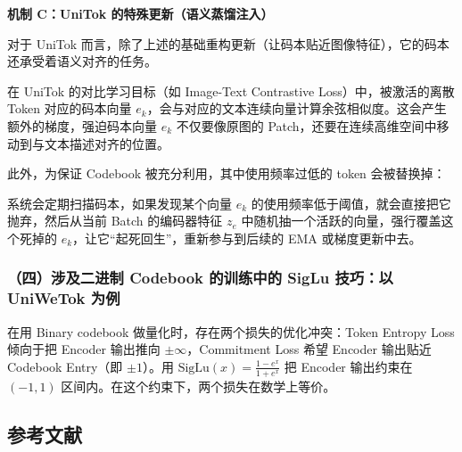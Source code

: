 \textbf{机制 C：UniTok 的特殊更新（语义蒸馏注入）}

对于 UniTok 而言，除了上述的基础重构更新（让码本贴近图像特征），它的码本还承受着语义对齐的任务。

在 UniTok 的对比学习目标（如 Image-Text Contrastive Loss）中，被激活的离散 Token 对应的码本向量 \(e_k\)，会与对应的文本连续向量计算余弦相似度。这会产生额外的梯度，强迫码本向量 \(e_k\) 不仅要像原图的 Patch，还要在连续高维空间中移动到与文本描述对齐的位置。

此外，为保证 Codebook 被充分利用，其中使用频率过低的 token 会被替换掉：

系统会定期扫描码本，如果发现某个向量 \(e_k\) 的使用频率低于阈值，就会直接把它抛弃，然后从当前 Batch 的编码器特征 \(z_e\) 中随机抽一个活跃的向量，强行覆盖这个死掉的 \(e_k\)，让它``起死回生''，重新参与到后续的 EMA 或梯度更新中去。

\hypertarget{ux56dbux6d89ux53caux4e8cux8fdbux5236-codebook-ux7684ux8badux7ec3ux4e2dux7684-siglu-ux6280ux5de7ux4ee5-uniwetok-ux4e3aux4f8b}{%
\subsubsection{（四）涉及二进制 Codebook 的训练中的 SigLu 技巧：以 UniWeTok 为例}\label{ux56dbux6d89ux53caux4e8cux8fdbux5236-codebook-ux7684ux8badux7ec3ux4e2dux7684-siglu-ux6280ux5de7ux4ee5-uniwetok-ux4e3aux4f8b}}

在用 Binary codebook 做量化时，存在两个损失的优化冲突：Token Entropy Loss 倾向于把 Encoder 输出推向 \(\pm\infty\)，Commitment Loss 希望 Encoder 输出贴近 Codebook Entry（即 \(\pm1\)）。用 \(\mathrm{SigLu}(x)=\frac{1-e^x}{1+e^x}\) 把 Encoder 输出约束在 \((-1,1)\) 区间内。在这个约束下，两个损失在数学上等价。

\FloatBarrier
{}
\hypertarget{ux53c2ux8003ux6587ux732e-146}{%
\subsection{参考文献}\label{ux53c2ux8003ux6587ux732e-146}}

